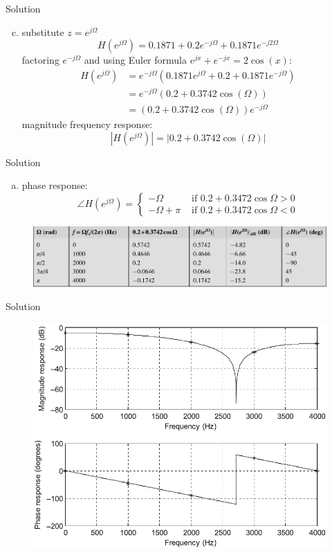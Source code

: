 \documentclass[pdflatex,compress,mathserif]{beamer}
\begin{document}
\begin{frame}{Solution}
    \begin{enumerate}[a.]
        \setcounter{enumi}{2}
        \item substitute $z = e^{j\Omega}$ $$ H(e^{j\Omega}) = 0.1871 + 0.2e^{-j\Omega} + 0.1871e^{-j2\Omega} $$ factoring $e^{-j\Omega}$ and using Euler formula $ e^{jx} + e^{-jx} = 2 \cos(x) $:
        \begin{align*}
            H(e^{j\Omega}) &= e^{-j\Omega}(0.1871e^{j\Omega} + 0.2 + 0.1871e^{-j\Omega}) \\
            &= e^{-j\Omega} (0.2 + 0.3742\cos(\Omega)) \\
            &= (0.2 + 0.3742\cos(\Omega)) e^{-j\Omega}
        \end{align*} magnitude frequency response: $$|H(e^{j\Omega})| = |0.2 + 0.3742\cos(\Omega)|$$ 
    \end{enumerate}
\end{frame}

\begin{frame}{Solution}
    \begin{enumerate}[a.]
        \item[] phase response: $$ \angle H(e^{j\Omega}) = \begin{cases}
            -\Omega & \text{ if } 0.2 + 0.3472\cos \Omega > 0 \\
            -\Omega + \pi & \text{ if } 0.2 + 0.3472\cos \Omega < 0
        \end{cases}$$
    \end{enumerate}
    \begin{figure}
        \centering
        \includegraphics[width=\linewidth]{./img/img10.png}
    \end{figure}
\end{frame}

\begin{frame}{Solution}
    \begin{figure}
        \centering
        \includegraphics[width=0.8\linewidth]{./img/img11.png}
    \end{figure}
\end{frame}
\end{document}
